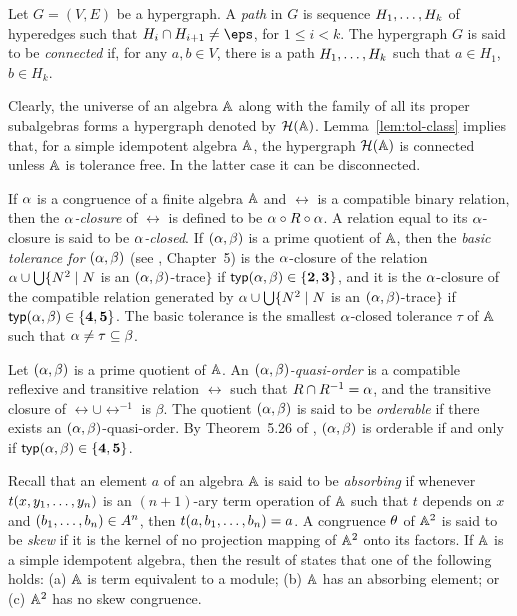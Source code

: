 \documentclass[11pt]{article}
\begin{document}
Let $G=(V,E)$ be a hypergraph. A {\em path} in $G$
is sequence $H _1,\ldots, H _{k}$ of hyperedges such that $H_i\cap H_{i+1}\ne\eps$, 
for $1\le i< k$. The hypergraph $G$ is said to be {\em connected} if,
for any $a,b\in V$, there is a path $H _1,\ldots, H _{k}$ such that $a\in H_1$,
$b\in H_k$.

Clearly, the universe of an algebra ${\mathbb A}$ along with the family of all
its proper subalgebras forms a hypergraph denoted by
${\mathcal H}({\mathbb A})$. Lemma~\ref{lem:tol-class} implies that, for a simple
idempotent algebra ${\mathbb A}$, the hypergraph ${\mathcal H}({\mathbb A})$ is connected unless 
${\mathbb A}$ is tolerance free. In the latter case it can be disconnected.

If $\alpha$ is a congruence of a finite algebra ${\mathbb A}$ and $\rel$ is a
compatible binary relation, then the {\em $\alpha$-closure} of $\rel$ is
defined to be $\alpha\circ R\circ\alpha$. A relation equal to its
$\alpha$-closure is said to be {\em $\alpha$-closed}. If $(\alpha,\beta)$ is a prime
quotient of ${\mathbb A}$, then the {\em basic tolerance for} $(\alpha,\beta)$ (see
\cite{Hobby88:structure}, Chapter~5) is the $\alpha$-closure of the
relation $\alpha\cup\bigcup\{N^2\mid N$ is an $(\alpha,\beta)$-trace$\}$ 
if ${\sf typ}(\alpha,\beta)\in\{{\bf2},{\bf3}\}$, and it is the
$\alpha$-closure of the compatible relation generated by
$\alpha\cup\bigcup\{N^2\mid N$ is an $(\alpha,\beta)$-trace$\}$ if
${\sf typ}(\alpha,\beta)\in\{{\bf4},{\bf5}\}$. The basic tolerance is the
smallest $\alpha$-closed tolerance $\tau$ of ${\mathbb A}$ such that
$\alpha\ne\tau\subseteq\beta$. 

Let $(\alpha,\beta)$ is a prime quotient of ${\mathbb A}$. An {\em
$(\alpha,\beta)$-quasi-order} is a compatible reflexive and
transitive relation $\rel$ such that $R\cap R^{-1}=\alpha$, and the
transitive closure of $\rel\cup\rel^{-1}$ is $\beta$. The quotient
$(\alpha,\beta)$ is said to be {\em orderable} if there exists an
$(\alpha,\beta)$-quasi-order. By Theorem~5.26 of
\cite{Hobby88:structure}, $(\alpha,\beta)$ is 
orderable if and only if ${\sf typ}(\alpha,\beta)\in\{{\bf4},{\bf5}\}$.

Recall that an element $a$ of an algebra ${\mathbb A}$
is said to be {\em absorbing} if whenever $t(x,y _1,\ldots, y _{n})$ is an
$(n+1)$-ary term operation of ${\mathbb A}$ such that $t$ depends on $x$ and
$(b _1,\ldots, b _{n})\in A^n$, then $t(a,b _1,\ldots, b _{n})=a$. A congruence $\theta$ of 
${\mathbb A}^2$ is said to be {\em skew} if it is the kernel of no projection
mapping of ${\mathbb A}^2$ onto its factors. If ${\mathbb A}$ is a simple idempotent
algebra, then the result of \cite{Kearnes96:idempotent} states that
one of the following holds: (a) ${\mathbb A}$ is term equivalent to a module;
(b) ${\mathbb A}$ has an absorbing element; or (c) ${\mathbb A}^2$ has no skew
congruence. 
\end{document}
